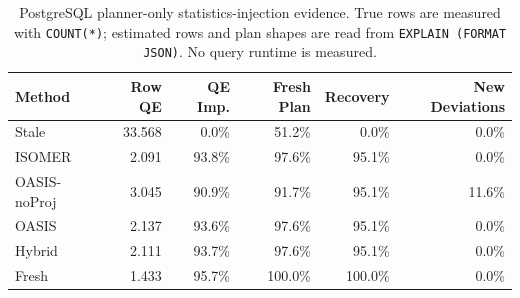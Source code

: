 \begin{table}[t]
  \centering
  \small
  \caption{PostgreSQL planner-only statistics-injection evidence. True rows are measured with \texttt{COUNT(*)}; estimated rows and plan shapes are read from \texttt{EXPLAIN (FORMAT JSON)}. No query runtime is measured.}
  \label{tab:postgres_planner_stats_injection}
  \setlength{\tabcolsep}{4pt}
  \begin{tabular}{lrrrrr}
    \toprule
    Method & Row QE & QE Imp. & Fresh Plan & Recovery & New Deviations \\
    \midrule
    Stale & 33.568 & 0.0\% & 51.2\% & 0.0\% & 0.0\% \\
    ISOMER & 2.091 & 93.8\% & 97.6\% & 95.1\% & 0.0\% \\
    OASIS-noProj & 3.045 & 90.9\% & 91.7\% & 95.1\% & 11.6\% \\
    OASIS & 2.137 & 93.6\% & 97.6\% & 95.1\% & 0.0\% \\
    Hybrid & 2.111 & 93.7\% & 97.6\% & 95.1\% & 0.0\% \\
    Fresh & 1.433 & 95.7\% & 100.0\% & 100.0\% & 0.0\% \\
    \bottomrule
  \end{tabular}
\end{table}
